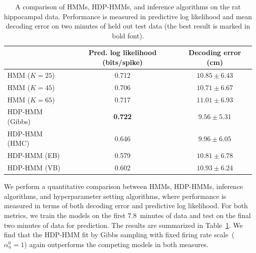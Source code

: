 \begin{table}[b]
  \centering
  \caption[Comparison of models on real hippocampal data]{A comparison
    of HMMs, HDP-HMMs, and inference algorithms on the rat hippocampal
    data. Performance is measured in predictive log likelihood and
    mean decoding error on two minutes of held out test data (the best
    result is marked in bold font).}
  \begin{tabular}{l|cc}
    & Pred. log likelihood (bits/spike) & Decoding error (cm) \\
    \hline 
    HMM ($K=25$)         & 0.712 & $10.85 \pm 6.43$ \\
    HMM ($K=45$)         & 0.706 & $10.71 \pm 6.67$\\
    HMM ($K=65$)         & 0.717 & $11.01 \pm 6.93$\\
    HDP-HMM (Gibbs)    & \bf{0.722} & $\mathbf{9.56 \pm 5.31}$ \\
    HDP-HMM (HMC)      & 0.646 & $9.96 \pm 6.05$\\
    HDP-HMM (EB)       & 0.579 & $10.81 \pm 6.78$\\
    HDP-HMM (VB)       & 0.602 & $10.93 \pm 6.24$\\
    
    \hline
  \end{tabular}
  \label{tab:hipp_err}
\end{table}

We perform a quantitative comparison between HMMs, HDP-HMMs, inference
algorithms, and hyperparameter setting algorithms, where performance
is measured in terms of both decoding error and predictive log
likelihood. For both metrics, we train the models on the first
$7.8$~minutes of data and test on the final two minutes of data for
prediction. The results are summarized in Table~\ref{tab:hipp_err}. We
find that the HDP-HMM fit by Gibbs sampling with fixed firing rate
scale~($\alpha_n^0=1$) again outperforms the competing models in both
measures.

